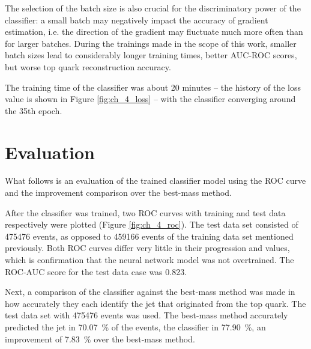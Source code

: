 The selection of the batch size is also crucial for the discriminatory power of the classifier: a small batch may negatively impact the accuracy of gradient estimation, i.e. the direction of the gradient may fluctuate much more often than for larger batches. During the trainings made in the scope of this work, smaller batch sizes lead to considerably longer training times, better AUC-ROC scores, but worse top quark reconstruction accuracy.

The training time of the classifier was about 20 minutes -- the history of the loss value is shown in Figure \ref{fig:ch_4_loss} -- with the classifier converging around the 35th epoch.

\section{Evaluation}
\label{sec:ch-4-eval}
What follows is an evaluation of the trained classifier model using the ROC curve and the improvement comparison over the best-mass method.

After the classifier was trained, two ROC curves with training and test data respectively were plotted (Figure \ref{fig:ch_4_roc}). The test data set consisted of \num{475476} events, as opposed to \num{459166} events of the training data set mentioned previously. Both ROC curves differ very little in their progression and values, which is confirmation that the neural network model was not overtrained. The ROC-AUC score for the test data case was 0.823.

Next, a comparison of the classifier against the best-mass method was made in how accurately they each identify the jet that originated from the top quark. The test data set with \num{475476} events was used. The best-mass method accurately predicted the jet in \SI{70.07}{\%} of the events, the classifier in \SI{77.90}{\%}, an improvement of \SI{7.83}{\%} over the best-mass method.


